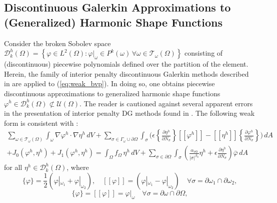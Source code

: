 \subsection*{Discontinuous Galerkin Approximations to \\ (Generalized) Harmonic Shape Functions}

	Consider the broken Sobolev space $\mathcal{D}^h_k (\Omega) = \left\{ \varphi \in L^2 (\Omega) : \varphi|_{\omega} \in P^k (\omega) \, \forall \omega \in \mathcal{T}_\omega (\Omega) \right\}$ consisting of (discontinuous) piecewise polynomials defined over the partition of the element. Herein, the family of interior penalty discontinuous Galerkin methods described in \cite{Riviere:08} are applied to (\ref{eq:weak_bvp}). In doing so, one obtains piecewise discontinuous approximations to generalized harmonic shape functions $\varphi^h \in \mathcal{D}^h_k (\Omega) \not\subset \mathcal{U} (\Omega)$. The reader is cautioned against several apparent errors in the presentation of interior penalty DG methods found in \cite{Riviere:08}. The following weak form is consistent with \cite{Riviere:01}:
	\begin{eqnarray}
		\sum_{\omega \in \mathcal{T}_\omega (\Omega)} \int_{\omega} \nabla \varphi^h \cdot \nabla \eta^h \, dV + \sum_{\sigma \in \Gamma_\omega \cup \partial \Omega} \int_{\sigma} \bigg( \epsilon \left\{ \frac{\partial \eta^h}{\partial N_{\sigma}} \right\} [\![ \varphi^h ]\!] - [\![ \eta^h ]\!] \left\{ \frac{\partial \varphi^h}{\partial N_{\sigma}} \right\}  \bigg) \, dA \nonumber \\ + J_0 (\varphi^h,\eta^h) + J_1 (\varphi^h,\eta^h) = \int_{\Omega} f_{\Omega} \, \eta^h \, dV + \sum_{\sigma \in \partial \Omega} \int_{\sigma} \left(\frac{\alpha_{\sigma0}}{|\sigma|^{\beta_0}} \eta^h + \epsilon \frac{\partial \eta^h}{\partial N_{\sigma}} \right) \bar{\varphi} \, dA
		\label{eq:dg_poisson}
	\end{eqnarray}
	for all $\eta^h \in \mathcal{D}^h_k (\Omega)$, where
	\begin{equation}
		\{ \varphi \} = \frac{1}{2} (\varphi|_{\omega_1} + \varphi|_{\omega_2}), \quad [\![ \varphi ]\!] = (\varphi|_{\omega_1} - \varphi|_{\omega_2}) \quad \forall \sigma = \partial \omega_1 \cap \partial \omega_2,
		\label{eq:internal_jumps}
	\end{equation}
	\begin{equation}
		\{ \varphi \} = [\![ \varphi ]\!] = \varphi|_{\omega} \quad \forall \sigma = \partial \omega \cap \partial \Omega,
		\label{eq:external_jumps}
	\end{equation}

